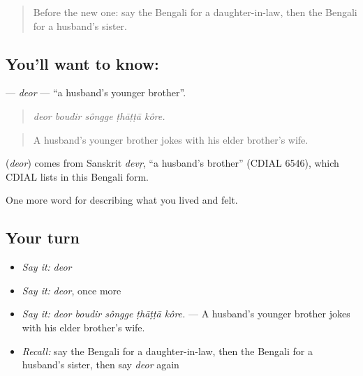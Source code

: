 \begin{quote}
Before the new one: say the Bengali for a daughter-in-law, then the Bengali for a husband's sister.
\end{quote}

\subsection*{You'll want to know: }
\textbf{} — \emph{deor} — \textquotedblleft{}a husband's younger brother\textquotedblright{}.

\begin{quote}
    
\end{quote}

\begin{quote}
\emph{deor boudir sôngge ṭhāṭṭā kôre.}
\end{quote}

\begin{quote}
A husband's younger brother jokes with his elder brother's wife.
\end{quote}

\begin{cousinweb}
\textbf{} (\emph{deor}) comes from Sanskrit \emph{devṛ}, \textquotedblleft{}a husband's brother\textquotedblright{} (CDIAL 6546), which CDIAL lists in this Bengali form.
\end{cousinweb}

\begin{grammarlens}[title={What you've built}]
One more word for describing what you lived and felt.
\end{grammarlens}

\subsection*{Your turn}
\begin{itemize}
\raggedright
  \item \emph{Say it:} \emph{deor}
  \item \emph{Say it:} \emph{deor}, once more
  \item \emph{Say it:} \emph{deor boudir sôngge ṭhāṭṭā kôre.} — A husband's younger brother jokes with his elder brother's wife.
  \item \emph{Recall:} say the Bengali for a daughter-in-law, then the Bengali for a husband's sister, then say \emph{deor} again
\end{itemize}

